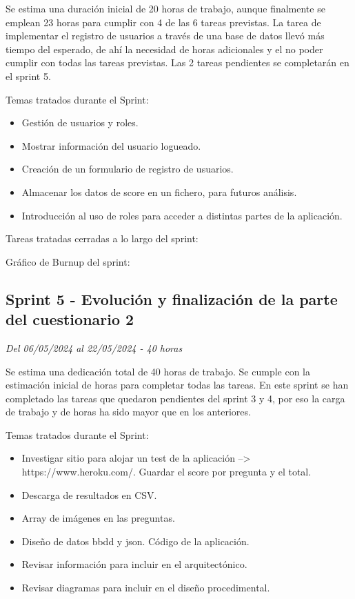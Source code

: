 Se estima una duración inicial de 20 horas de trabajo, aunque finalmente se emplean 23 horas para cumplir con 4 de las 6 tareas previstas.
La tarea de implementar el registro de usuarios a través de una base de datos llevó más tiempo del esperado, de ahí la necesidad de horas adicionales y el no poder cumplir con todas las tareas previstas.
Las 2 tareas pendientes se completarán en el sprint 5.

Temas tratados durante el Sprint:
\begin{itemize}
	\item
	Gestión de usuarios y roles.
	\item
	Mostrar información del usuario logueado.
	\item
	Creación de un formulario de registro de usuarios.
	\item
	Almacenar los datos de score en un fichero, para futuros análisis.
	\item
	Introducción al uso de roles para acceder a distintas partes de la aplicación.
\end{itemize}

Tareas tratadas cerradas a lo largo del sprint:

Gráfico de Burnup del sprint:

\subsection{Sprint 5 - Evolución y finalización de la parte del cuestionario 2}
\textit{Del 06/05/2024 al 22/05/2024 - 40 horas}

Se estima una dedicación total de 40 horas de trabajo.
Se cumple con la estimación inicial de horas para completar todas las tareas.
En este sprint se han completado las tareas que quedaron pendientes del sprint 3 y 4, por eso la carga de trabajo y de horas ha sido mayor que en los anteriores.

Temas tratados durante el Sprint:

\begin{itemize}
	\item
	Investigar sitio para alojar un test de la aplicación --> https://www.heroku.com/.
	Guardar el score por pregunta y el total.
	\item
	Descarga de resultados en CSV.
	\item
	Array de imágenes en las preguntas.
	\item
	Diseño de datos bbdd y json. Código de la aplicación.
	\item
	Revisar información para incluir en el arquitectónico.
	\item
	Revisar diagramas para incluir en el diseño procedimental.
\end{itemize}

